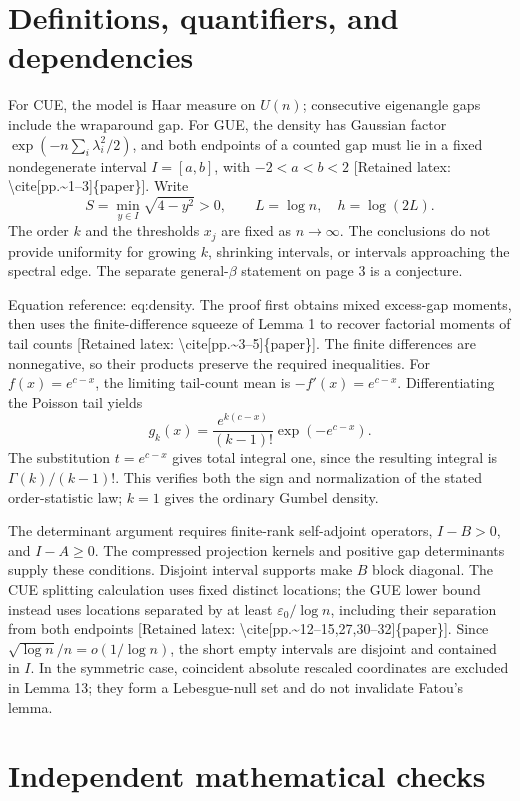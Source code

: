 \documentclass[10pt]{article}
\begin{document}
\section*{Definitions, quantifiers, and dependencies}
For CUE, the model is Haar measure on \(U(n)\); consecutive eigenangle gaps include the wraparound gap. For GUE, the density has Gaussian factor \(\exp(-n\sum_i\lambda_i^2/2)\), and both endpoints of a counted gap must lie in a fixed nondegenerate interval \(I=[a,b]\), with \(-2<a<b<2\) [Retained latex: \textbackslash{}cite[pp.\textasciitilde{}1--3]\{paper\}]. Write \[S=\min_{y\in I}\sqrt{4-y^2}>0,\qquad L=\log n,\quad h=\log(2L).\] The order \(k\) and the thresholds \(x_j\) are fixed as \(n\to\infty\). The conclusions do not provide uniformity for growing \(k\), shrinking intervals, or intervals approaching the spectral edge. The separate general-\(\beta\) statement on page 3 is a conjecture.\par
Equation reference: eq:density. The proof first obtains mixed excess-gap moments, then uses the finite-difference squeeze of Lemma 1 to recover factorial moments of tail counts [Retained latex: \textbackslash{}cite[pp.\textasciitilde{}3--5]\{paper\}]. The finite differences are nonnegative, so their products preserve the required inequalities. For \(f(x)=e^{c-x}\), the limiting tail-count mean is \(-f'(x)=e^{c-x}\). Differentiating the Poisson tail yields \[
g_k(x)=\frac{e^{k(c-x)}}{(k-1)!}\exp(-e^{c-x}).\] The substitution \(t=e^{c-x}\) gives total integral one, since the resulting integral is \(\Gamma(k)/(k-1)!\). This verifies both the sign and normalization of the stated order-statistic law; \(k=1\) gives the ordinary Gumbel density.\par
The determinant argument requires finite-rank self-adjoint operators, \(I-B>0\), and \(I-A\geq0\). The compressed projection kernels and positive gap determinants supply these conditions. Disjoint interval supports make \(B\) block diagonal. The CUE splitting calculation uses fixed distinct locations; the GUE lower bound instead uses locations separated by at least \(\varepsilon_0/\log n\), including their separation from both endpoints [Retained latex: \textbackslash{}cite[pp.\textasciitilde{}12--15,27,30--32]\{paper\}]. Since \(\sqrt{\log n}/n=o(1/\log n)\), the short empty intervals are disjoint and contained in \(I\). In the symmetric case, coincident absolute rescaled coordinates are excluded in Lemma 13; they form a Lebesgue-null set and do not invalidate Fatou’s lemma.\par
\section*{Independent mathematical checks}
\end{document}
